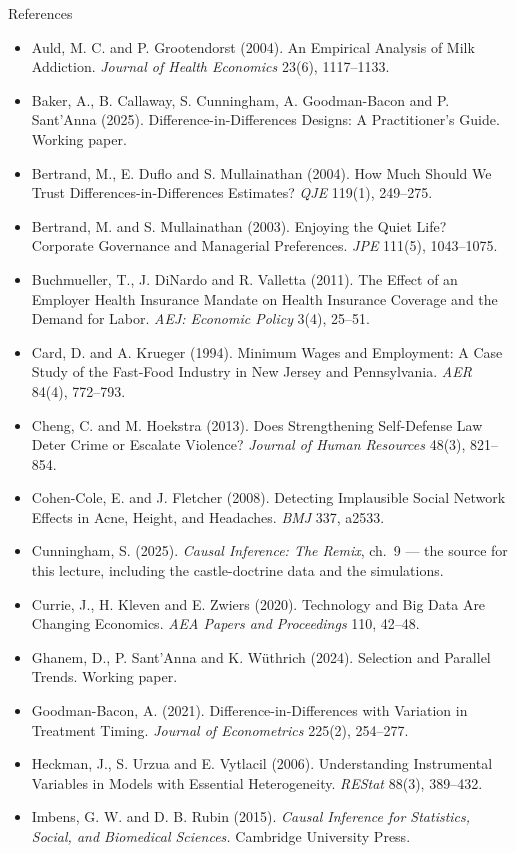 \documentclass[
  11pt,
  ignorenonframetext,
  aspectratio=169,
]{beamer}
\providecommand{\tightlist}{%
  \setlength{\itemsep}{0pt}\setlength{\parskip}{0pt}}
\begin{document}
\begin{frame}{References}
\protect{}\label{references}
\tiny

\begin{itemize}
\tightlist
\item
  Auld, M. C. and P. Grootendorst (2004). An Empirical Analysis of Milk
  Addiction. \emph{Journal of Health Economics} 23(6), 1117--1133.
\item
  Baker, A., B. Callaway, S. Cunningham, A. Goodman-Bacon and P.
  Sant'Anna (2025). Difference-in-Differences Designs: A Practitioner's
  Guide. Working paper.
\item
  Bertrand, M., E. Duflo and S. Mullainathan (2004). How Much Should We
  Trust Differences-in-Differences Estimates? \emph{QJE} 119(1),
  249--275.
\item
  Bertrand, M. and S. Mullainathan (2003). Enjoying the Quiet Life?
  Corporate Governance and Managerial Preferences. \emph{JPE} 111(5),
  1043--1075.
\item
  Buchmueller, T., J. DiNardo and R. Valletta (2011). The Effect of an
  Employer Health Insurance Mandate on Health Insurance Coverage and the
  Demand for Labor. \emph{AEJ: Economic Policy} 3(4), 25--51.
\item
  Card, D. and A. Krueger (1994). Minimum Wages and Employment: A Case
  Study of the Fast-Food Industry in New Jersey and Pennsylvania.
  \emph{AER} 84(4), 772--793.
\item
  Cheng, C. and M. Hoekstra (2013). Does Strengthening Self-Defense Law
  Deter Crime or Escalate Violence? \emph{Journal of Human Resources}
  48(3), 821--854.
\item
  Cohen-Cole, E. and J. Fletcher (2008). Detecting Implausible Social
  Network Effects in Acne, Height, and Headaches. \emph{BMJ} 337, a2533.
\item
  Cunningham, S. (2025). \emph{Causal Inference: The Remix}, ch.~9 ---
  the source for this lecture, including the castle-doctrine data and
  the simulations.
\item
  Currie, J., H. Kleven and E. Zwiers (2020). Technology and Big Data
  Are Changing Economics. \emph{AEA Papers and Proceedings} 110, 42--48.
\item
  Ghanem, D., P. Sant'Anna and K. Wüthrich (2024). Selection and
  Parallel Trends. Working paper.
\item
  Goodman-Bacon, A. (2021). Difference-in-Differences with Variation in
  Treatment Timing. \emph{Journal of Econometrics} 225(2), 254--277.
\item
  Heckman, J., S. Urzua and E. Vytlacil (2006). Understanding
  Instrumental Variables in Models with Essential Heterogeneity.
  \emph{REStat} 88(3), 389--432.
\item
  Imbens, G. W. and D. B. Rubin (2015). \emph{Causal Inference for
  Statistics, Social, and Biomedical Sciences.} Cambridge University
  Press.
\end{itemize}
\end{frame}
\end{document}
